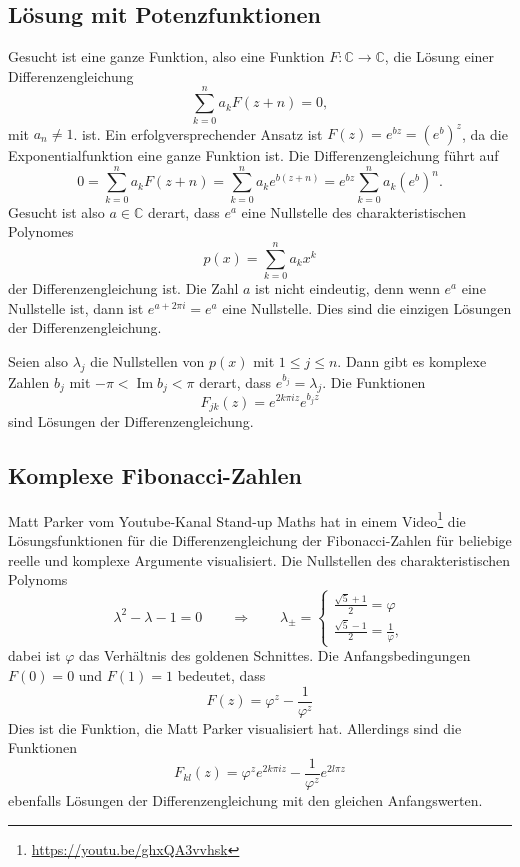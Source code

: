 \subsection{Lösung mit Potenzfunktionen}
Gesucht ist eine ganze Funktion, also eine Funktion
$F\colon\mathbb{C}\to\mathbb{C}$, die Lösung einer
Differenzengleichung
\begin{equation}
\sum_{k=0}^n a_kF(z+n)=0,
\end{equation}
mit $a_n\ne 1$.
ist.
Ein erfolgversprechender Ansatz ist $F(z)=e^{bz}=(e^b)^z$, da die
Exponentialfunktion eine ganze Funktion ist.
Die Differenzengleichung führt auf
\[
0
=
\sum_{k=0}^n
a_kF(z+n)
=
\sum_{k=0}^n
a_k e^{b(z+n)}
=
e^{bz}
\sum_{k=0}^n
a_k (e^b)^n.
\]
Gesucht ist also $a\in\mathbb{C}$ derart, dass $e^a$ eine Nullstelle
des charakteristischen Polynomes
\[
p(x) = \sum_{k=0}^n a_kx^k
\]
der Differenzengleichung ist.
Die Zahl $a$ ist nicht eindeutig, denn wenn $e^a$ eine Nullstelle ist,
dann ist $e^{a+2\pi i}=e^a$ eine Nullstelle.
Dies sind die einzigen Lösungen der Differenzengleichung.

Seien also $\lambda_j$ die Nullstellen von $p(x)$ mit $1\le j\le n$.
Dann gibt es komplexe Zahlen $b_j$ 
mit $-\pi < \operatorname{Im}b_j < \pi$ derart, dass $e^{b_j}=\lambda_j$.
Die Funktionen
\[
F_{jk}(z) = e^{2k\pi i z} e^{b_jz}
\]
sind Lösungen der Differenzengleichung.

\subsection{Komplexe Fibonacci-Zahlen}
Matt Parker vom Youtube-Kanal Stand-up Maths hat in einem
Video\footnote{\url{https://youtu.be/ghxQA3vvhsk}} die Lösungsfunktionen
für die Differenzengleichung der Fibonacci-Zahlen für beliebige
reelle und komplexe Argumente visualisiert.
Die Nullstellen des charakteristischen Polynoms
\[
\lambda^2-\lambda-1=0
\qquad
\Rightarrow
\qquad
\lambda_\pm = \begin{cases}
\displaystyle
\frac{\sqrt{5}+1}{2}=\varphi
\\[3pt]
\displaystyle
\frac{\sqrt{5}-1}{2}=\frac{1}{\varphi},
\end{cases}
\]
dabei ist $\varphi$ das Verhältnis des goldenen Schnittes.
Die Anfangsbedingungen $F(0)=0$ und $F(1)=1$ bedeutet, dass
\[
F(z) = \varphi^z - \frac{1}{\varphi^z}
\]
Dies ist die Funktion, die Matt Parker visualisiert hat.
Allerdings sind die Funktionen
\[
F_{kl}(z)
=
\varphi^ze^{2k\pi iz}
-
\frac{1}{\varphi^z} e^{2l\pi z}
\]
ebenfalls Lösungen der Differenzengleichung mit den gleichen 
Anfangswerten.




